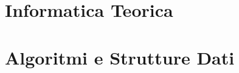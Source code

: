 \documentclass{book}
\begin{document}
  

  \tableofcontents
  \clearpage

  \part{Informatica Teorica}

  
  
  
  
  
  

  \part{Algoritmi e Strutture Dati}
  
  
  
\end{document}
